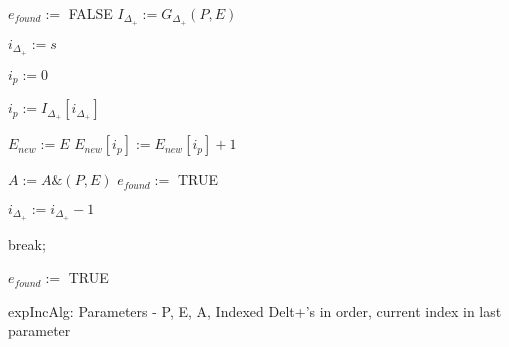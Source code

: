 \documentclass[../paper.tex]{subfiles}
\begin{document}
\begin{algorithmic}

\STATE $e_{found} :=$ FALSE
\STATE $I_{\Delta_{+}} := G_{ \Delta_{+}}(P,E)$

\STATE $i_{\Delta_{+}} := s$ %

\STATE $i_p := 0$ %

	\STATE $i_p := I_{\Delta_{+}}[ i_{\Delta_{+}} ]$


		\STATE {}
		\STATE $E_{new} := E$
		\STATE $E_{new}[ i_p ] := E_{new}[ i_p ] + 1 $
		
			\STATE $A := A\&(P,E)$
			\STATE $e_{found} := $ TRUE
		\ENDIF

		\STATE $i_{\Delta_{+}} := i_{\Delta_{+}} - 1$  
	
	\ELSE
		\STATE break;
	\ENDIF
\ENDWHILE


	\STATE {}
		\STATE $e_{found} := $ TRUE
	\ENDIF
\ENDIF

\end{algorithmic}
expIncAlg: Parameters - P, E, A, Indexed Delt+'s in order, current index
in last parameter
\end{document}
